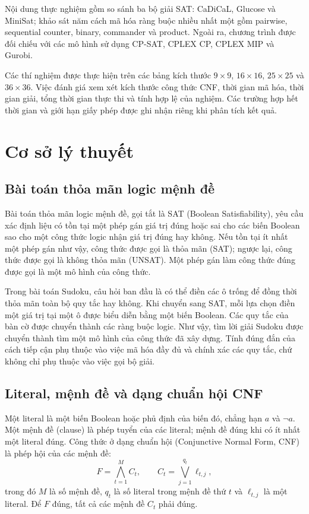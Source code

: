 \documentclass[a4paper,fleqn]{cas-sc}
\begin{document}
Nội dung thực nghiệm gồm so sánh ba bộ giải SAT:
CaDiCaL, Glucose và MiniSat; khảo sát năm cách mã hóa
ràng buộc nhiều nhất một gồm pairwise, sequential counter,
binary, commander và product. Ngoài ra, chương trình
được đối chiếu với các mô hình sử dụng CP-SAT,
CPLEX CP, CPLEX MIP và Gurobi.

Các thí nghiệm được thực hiện trên các bảng kích thước
$9 \times 9$, $16 \times 16$, $25 \times 25$ và
$36 \times 36$. Việc đánh giá xem xét kích thước
công thức CNF, thời gian mã hóa, thời gian giải,
tổng thời gian thực thi và tính hợp lệ của nghiệm.
Các trường hợp hết thời gian và giới hạn giấy phép
được ghi nhận riêng khi phân tích kết quả.

\section{Cơ sở lý thuyết}
\label{sec:lythuyet}

\subsection{Bài toán thỏa mãn logic mệnh đề}

Bài toán thỏa mãn logic mệnh đề, gọi tắt là SAT (Boolean Satisfiability),
yêu cầu xác định liệu có tồn tại một phép gán giá trị đúng hoặc sai cho các
biến Boolean sao cho một công thức logic nhận giá trị đúng hay không.
Nếu tồn tại ít nhất một phép gán như vậy, công thức được gọi là thỏa mãn
(SAT); ngược lại, công thức được gọi là không thỏa mãn (UNSAT).
Một phép gán làm công thức đúng được gọi là một mô hình của công thức.

Trong bài toán Sudoku, câu hỏi ban đầu là có thể điền các ô trống để đồng
thời thỏa mãn toàn bộ quy tắc hay không. Khi chuyển sang SAT, mỗi lựa chọn
điền một giá trị tại một ô được biểu diễn bằng một biến Boolean. Các quy
tắc của bàn cờ được chuyển thành các ràng buộc logic. Như vậy, tìm lời giải
Sudoku được chuyển thành tìm một mô hình của công thức đã xây dựng.
Tính đúng đắn của cách tiếp cận phụ thuộc vào việc mã hóa đầy đủ và chính
xác các quy tắc, chứ không chỉ phụ thuộc vào việc gọi bộ giải.

\subsection{Literal, mệnh đề và dạng chuẩn hội CNF}

Một literal là một biến Boolean hoặc phủ định của biến đó, chẳng hạn $a$
và $\neg a$. Một mệnh đề (clause) là phép tuyển của các literal; mệnh đề
đúng khi có ít nhất một literal đúng. Công thức ở dạng chuẩn hội
(Conjunctive Normal Form, CNF) là phép hội của các mệnh đề:
\begin{equation}
 F=\bigwedge_{t=1}^{M} C_t,
 \qquad C_t=\bigvee_{j=1}^{q_t}\ell_{t,j},
 \label{eq:theory-cnf}
\end{equation}
trong đó $M$ là số mệnh đề, $q_t$ là số literal trong mệnh đề thứ $t$ và
$\ell_{t,j}$ là một literal. Để $F$ đúng, tất cả các mệnh đề $C_t$ phải đúng.
\end{document}
